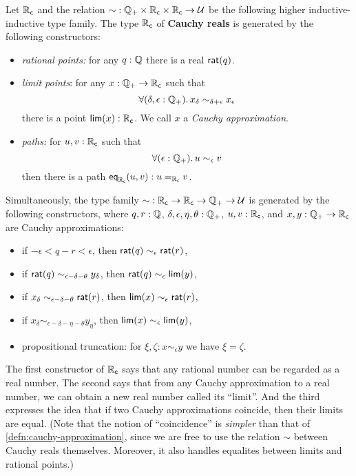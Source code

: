 \begin{defn}\label{defn:cauchy-reals}
  Let $\RC$ and the relation $\mathord\sim:\Qp \times \RC \times \RC \to \type$ be the following higher inductive-inductive type family.
  The type $\RC$ of \textbf{Cauchy reals} is generated by the following constructors:
  \begin{itemize}
  \item \emph{rational points:} 
    for any $q : \Q$ there is a real $\rcrat(q)$.
  \item \emph{limit points}:
    for any $x : \Qp \to \RC$ such that
    \begin{equation}
      \label{eq:RC-cauchy}
      \fall{\delta, \epsilon : \Qp} x_\delta \sim_{\delta + \epsilon} x_\epsilon
    \end{equation}
    there is a point $\rclim(x) : \RC$. We call $x$ a \emph{Cauchy approximation}.
  \item \emph{paths:}
    for $u, v : \RC$ such that
    \begin{equation}
      \label{eq:RC-path}
      \fall{\epsilon : \Qp} u \sim_\epsilon v
    \end{equation}
    then there is a path $\rceq(u, v) : \id[\RC]{u}{v}$.
  \end{itemize}
  Simultaneously, the type family $\mathord\sim:\RC\to\RC\to\Qp \to\type$ is generated by the following constructors, where $q, r : \Q$,  $\delta, \epsilon, \eta, \theta : \Qp$, $u, v : \RC$, and $x, y : \Qp \to \RC$ are Cauchy approximations:
  \begin{itemize}
  \item if $-\epsilon < q - r < \epsilon$, then $\rcrat(q) \sim_\epsilon \rcrat(r)$,
  \item if $\rcrat(q) \sim_{\epsilon - \delta - \theta} y_\delta$, then $\rcrat(q) \sim_{\epsilon} \rclim(y)$,
  \item if $x_\delta \sim_{\epsilon - \delta - \theta} \rcrat(r)$, then $\rclim(x) \sim_\epsilon \rcrat(r)$,
  \item if $x_\delta \sim_{\epsilon - \delta - \eta - \theta} y_\eta$, then $\rclim(x) \sim_\epsilon \rclim(y)$,
  \item propositional truncation: for $\xi,\zeta : x \sim_{\epsilon} y$ we have $\xi=\zeta$.
  \end{itemize}
\end{defn}

\medskip

The first constructor of $\RC$ says that any rational number can be regarded as a real number.
The second says that from any Cauchy approximation to a real number, we can obtain a new real number called its ``limit''.
And the third expresses the idea that if two Cauchy approximations coincide, then their limits are equal.
(Note that the notion of ``coincidence'' is \emph{simpler} than that of \autoref{defn:cauchy-approximation}, since we are free to use the relation $\sim$ between Cauchy reals themselves.
Moreover, it also handles equalites between limits and rational points.)

